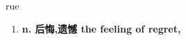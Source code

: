 
\begin{frame}
{\huge rue}
\begin{center}
\begin{enumerate}\Large
  \item \textbf{n. 后悔,遗憾 the feeling of regret,}
\end{enumerate}
\end{center}
\end{frame}
